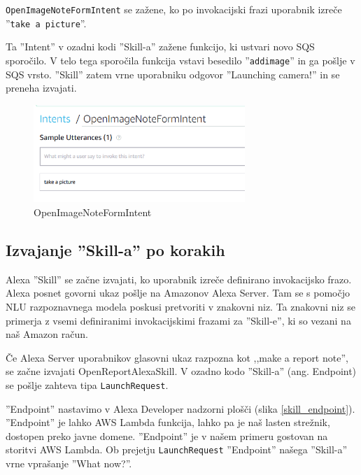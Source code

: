 \documentclass[a4paper, 12pt]{book}
\begin{document}
\texttt{OpenImageNoteFormIntent} se zažene, ko po invokacijski frazi uporabnik izreče ''\texttt{take a picture}''.

Ta ''Intent'' v ozadni kodi ''Skill-a'' zažene funkcijo, ki ustvari novo SQS sporočilo.
V telo tega sporočila funkcija vstavi besedilo ''\texttt{addimage}'' in ga pošlje v SQS vrsto.
''Skill'' zatem vrne uporabniku odgovor ''Launching camera!'' in se preneha izvajati.

\begin{figure}[H]
\begin{center}
\includegraphics[width=8cm]{intent_image}
\end{center}
\caption{OpenImageNoteFormIntent}
\label{OpenImageNoteFormIntent}
\end{figure}

\subsection{Izvajanje ''Skill-a'' po korakih}

Alexa ''Skill'' se začne izvajati, ko uporabnik izreče definirano invokacijsko frazo.
Alexa posnet govorni ukaz pošlje na Amazonov Alexa Server.
Tam se s pomočjo NLU razpoznavnega modela poskusi pretvoriti v znakovni niz.
Ta znakovni niz se primerja z vsemi definiranimi invokacijskimi frazami za ''Skill-e'', ki so vezani na naš Amazon račun.

Če Alexa Server uporabnikov glasovni ukaz razpozna kot ,,make a report note'', se začne izvajati OpenReportAlexaSkill.
V ozadno kodo ''Skill-a'' (ang. Endpoint) se pošlje zahteva tipa \texttt{LaunchRequest}.

''Endpoint'' nastavimo v Alexa Developer nadzorni plošči (slika \ref{skill_endpoint}).
''Endpoint'' je lahko AWS Lambda funkcija, lahko pa je naš lasten strežnik, dostopen preko javne domene.
''Endpoint'' je v našem primeru gostovan na storitvi AWS Lambda.
Ob prejetju \texttt{LaunchRequest} ''Endpoint'' našega ''Skill-a'' vrne vprašanje ''What now?''.
\end{document}

